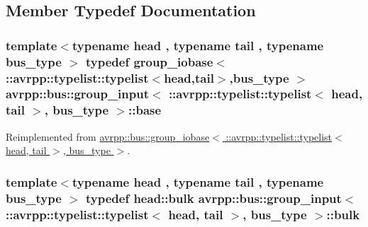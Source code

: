 \subsection{Member Typedef Documentation}
\hypertarget{structavrpp_1_1bus_1_1group__input_3_01_1_1avrpp_1_1typelist_1_1typelist_3_01head_00_01tail_01_4_00_01bus__type_01_4_a758a4f561ac4b89692ba64751aaf2afb}{
\subsubsection[{base}]{\setlength{\rightskip}{0pt plus 5cm}template$<$typename head , typename tail , typename bus\_\-type $>$ typedef group\_\-iobase$<$ ::{\bf avrpp::typelist::typelist}$<$head,tail$>$,bus\_\-type $>$ avrpp::bus::group\_\-input$<$ ::{\bf avrpp::typelist::typelist}$<$ head, tail $>$, bus\_\-type $>$::{\bf base}}}
\label{structavrpp_1_1bus_1_1group__input_3_01_1_1avrpp_1_1typelist_1_1typelist_3_01head_00_01tail_01_4_00_01bus__type_01_4_a758a4f561ac4b89692ba64751aaf2afb}


Reimplemented from \hyperlink{structavrpp_1_1bus_1_1group__iobase_3_01_1_1avrpp_1_1typelist_1_1typelist_3_01head_00_01tail_01_4_00_01bus__type_01_4_a3c2a3f7afa6c666e7a625d027e9e89e0}{avrpp::bus::group\_\-iobase$<$ ::avrpp::typelist::typelist$<$ head, tail $>$, bus\_\-type $>$}.

\hypertarget{structavrpp_1_1bus_1_1group__input_3_01_1_1avrpp_1_1typelist_1_1typelist_3_01head_00_01tail_01_4_00_01bus__type_01_4_a78526007dcd6a1d1e7e2a33d4ab36e6d}{
\subsubsection[{bulk}]{\setlength{\rightskip}{0pt plus 5cm}template$<$typename head , typename tail , typename bus\_\-type $>$ typedef head::bulk avrpp::bus::group\_\-input$<$ ::{\bf avrpp::typelist::typelist}$<$ head, tail $>$, bus\_\-type $>$::{\bf bulk}}}
\label{structavrpp_1_1bus_1_1group__input_3_01_1_1avrpp_1_1typelist_1_1typelist_3_01head_00_01tail_01_4_00_01bus__type_01_4_a78526007dcd6a1d1e7e2a33d4ab36e6d}


